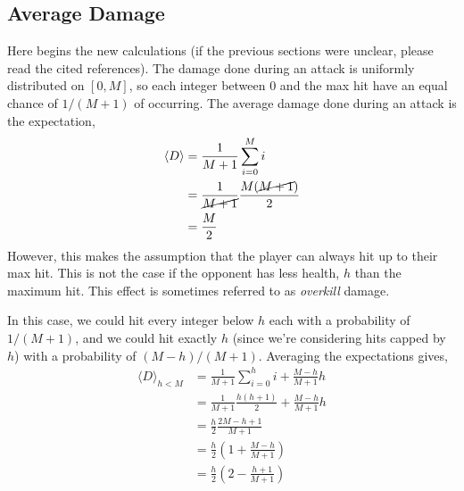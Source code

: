 \documentclass[../../main.tex]{subfiles}
\begin{document}
		\subsection{Average Damage}\label{sec:average_damage}
			Here begins the new calculations (if the previous sections were unclear, please read the cited references). The damage done during an attack is uniformly distributed on $[0, M]$, so each integer between 0 and the max hit have an equal chance of $1/(M + 1)$ of occurring. The average damage done during an attack is the expectation,
			\begin{align}
				\langle D \rangle &= \frac{1}{M+1}\sum_{i=0}^{M} i\\
				&= \frac{1}{\cancel{M+1}}\frac{M(\cancel{M+1})}{2}\\
				&= \frac{M}{2}
			\end{align}
			However, this makes the assumption that the player can always hit up to their max hit. This is not the case if the opponent has less health, $h$ than the maximum hit. This effect is sometimes referred to as \textit{overkill} damage.
			\begin{center}
			\end{center}
			In this case, we could hit every integer below $h$ each with a probability of $1/(M+1)$, and we could hit exactly $h$ (since we're considering hits capped by $h$) with a probability of $(M-h)/(M+1)$. Averaging the expectations gives,
			\begin{align}
				\langle D \rangle_{h < M} &= \frac{1}{M+1}\sum_{i=0}^{h} i + \frac{M-h}{M+1}h \\
				&= \frac{1}{M+1}\frac{h(h+1)}{2} + \frac{M-h}{M+1}h \\
				&= \frac{h}{2}\frac{2M-h+1}{M+1}\\
				&= \frac{h}{2}\left(1 + \frac{M - h}{M+1}\right)\\
				&= \frac{h}{2}\left(2 - \frac{h + 1}{M+1}\right)
			\end{align}
\end{document}

